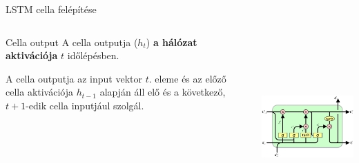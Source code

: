 \documentclass[english, aspectratio=169]{beamer}
\begin{document}
\begin{frame}{LSTM cella felépítése}
\begin{columns}
\begin{column}{.4\textwidth}
\begin{block}{Cella output}
A cella outputja ($h_t$) \textbf{a hálózat aktivációja} $t$ időlépésben.\par\smallskip
A cella outputja az input vektor $t$. eleme és az előző cella aktivációja $h_{t-1}$ alapján áll elő és a következő, $t+1$-edik cella inputjául szolgál. 
\end{block}
\end{column}
\begin{column}{.6\textwidth}
\begin{center}
\includegraphics[height=7cm, width=8.5cm, keepaspectratio]{images/recurrent_12.png}
\end{center}
\end{column}
\end{columns}
\end{frame}
\end{document}

